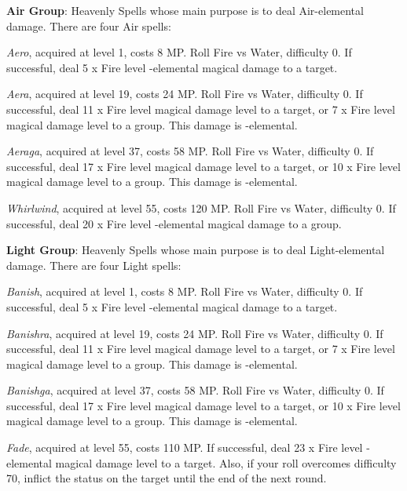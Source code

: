 \begin{multicols}{2}
    \ffcrystal[type=level,height=8pt]

    \textbf{Air Group}: Heavenly Spells whose main purpose is to deal Air-elemental damage. There are four Air spells:

    \textit{Aero}, acquired at level 1, costs 8 MP\@. Roll Fire vs Water, difficulty 0. If successful, deal 5 x Fire level -elemental magical damage to a target.

    \textit{Aera}, acquired at level 19, costs 24 MP\@. Roll Fire vs Water, difficulty 0. If successful, deal 11 x Fire level magical damage level to a target, or 7 x Fire level magical damage level to a group. This damage is -elemental.

    \textit{Aeraga}, acquired at level 37, costs 58 MP\@. Roll Fire vs Water, difficulty 0. If successful, deal 17 x Fire level magical damage level to a target, or 10 x Fire level magical damage level to a group. This damage is -elemental.

    \textit{Whirlwind}, acquired at level 55, costs 120 MP\@. Roll Fire vs Water, difficulty 0. If successful, deal 20 x Fire level -elemental magical damage to a group.

    \ffcrystal[type=level,height=8pt]

    \textbf{Light Group}: Heavenly Spells whose main purpose is to deal Light-elemental damage. There are four Light spells:

    \textit{Banish}, acquired at level 1, costs 8 MP\@. Roll Fire vs Water, difficulty 0. If successful, deal 5 x Fire level -elemental magical damage to a target.

    \textit{Banishra}, acquired at level 19, costs 24 MP\@. Roll Fire vs Water, difficulty 0. If successful, deal 11 x Fire level magical damage level to a target, or 7 x Fire level magical damage level to a group. This damage is -elemental.

    \textit{Banishga}, acquired at level 37, costs 58 MP\@. Roll Fire vs Water, difficulty 0. If successful, deal 17 x Fire level magical damage level to a target, or 10 x Fire level magical damage level to a group. This damage is -elemental.

    \textit{Fade}, acquired at level 55, costs 110 MP\@. If successful, deal 23 x Fire level -elemental magical damage level to a target. Also, if your roll overcomes difficulty 70, inflict the  status on the target until the end of the next round.


\end{multicols}
